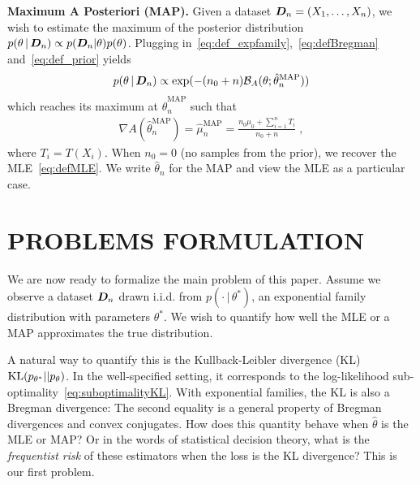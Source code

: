 \documentclass[twoside]{article}
\let\oldsection\section
\renewcommand{\section}[1]{\oldsection{\texorpdfstring{\uppercase{#1}}{#1}}}
\newcommand{\cond}{\,\vert\,}
\newcommand{\logpart}{A}
\newcommand{\bregman}{\cB_\logpart}
\newcommand{\bregmanconj}{\cB_{\logpart^*}}
\newcommand{\nat}{\theta}
\newcommand{\m}{\mu}
\newcommand{\meanp}{\m}
\newcommand{\MAPm}{\hat \m_n}
\newcommand{\MAPt}{\hat \nat_n}
\begin{document}
{\bf Maximum A Posteriori (MAP).}
Given a dataset ${\bm{D}}_n =(X_1,\dots,X_n)$, we wish to estimate the maximum of the posterior distribution $p(\nat \cond \mD_n) \propto p(\mD_n|\nat)p(\nat)$.
Plugging in~\eqref{eq:def_expfamily},~\eqref{eq:defBregman} and~\eqref{eq:def_prior} yields
\begin{align}
	p(\nat \cond \mD_n)
    \propto \exp(- (n_0+n) \bregman(\nat; \MAPt^\text{MAP}))
    \label{eq:joint_likelihood}
\end{align}
which reaches its maximum at $\MAPt^\text{MAP}$ such that
\begin{align}
    \nabla \logpart(\MAPt^\text{MAP}) = \MAPm^\text{MAP}
    = \frac{n_0 \meanp_0 + \sum_{i=1}^n T_i}{n_0+n} \; ,
    \label{eq:defMAP}
\end{align}
where $T_i=T(X_i)$.
When $n_0=0$ (no samples from the prior), we recover the MLE~\eqref{eq:defMLE}.
We write $\MAPt$ for the MAP and view the MLE as a particular case.


\section{PROBLEMS FORMULATION}
\label{sec:problem}

We are now ready to formalize the main problem of this paper. Assume we observe a dataset ${\bm{D}}_n$ drawn i.i.d. from $p(\cdot \cond\nat^*)$, an exponential family distribution
with parameters $\nat^*$.
We wish to quantify how well the MLE or a MAP approximates the true distribution.

A natural way to quantify this is the Kullback-Leibler divergence (KL) $\KL(p_{\nat^*} || p_\nat)$. %
In the well-specified setting, it corresponds to the log-likelihood sub-optimality~\eqref{eq:suboptimalityKL}.
With exponential families, the KL is also a Bregman divergence:
\alignn{
	\KL(p_{\nat^*} || p_\nat)
	 = \bregman(\nat ; \nat^*)
	 = \bregmanconj(\m^* ; \m) \; .
}
The second equality is a general property of Bregman divergences and convex conjugates. %
How does this quantity behave when $\hat \nat$ is the MLE or MAP?
 Or in the words of statistical decision theory, what is the \emph{frequentist risk} of these estimators when the loss is the KL divergence?
This is our first problem.
\end{document}
